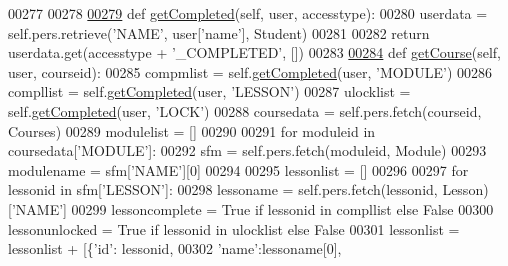\begin{DoxyCode}
00277 
00278 
\hypertarget{CourseUnit_8py_source_l00279}{}\hyperlink{classCourse_1_1CourseUnit_1_1BusCourse_a204497b0a06654e623c9c294f1ca5e66}{00279}     \textcolor{keyword}{def }\hyperlink{classCourse_1_1CourseUnit_1_1BusCourse_a204497b0a06654e623c9c294f1ca5e66}{getCompleted}(self, user, accesstype):
00280         userdata = self.pers.retrieve(\textcolor{stringliteral}{'NAME'}, user[\textcolor{stringliteral}{'name'}], Student)
00281 
00282         \textcolor{keywordflow}{return} userdata.get(accesstype + \textcolor{stringliteral}{'\_COMPLETED'}, [])
00283 
\hypertarget{CourseUnit_8py_source_l00284}{}\hyperlink{classCourse_1_1CourseUnit_1_1BusCourse_a924028d96b633d7810b60699af5502ee}{00284}     \textcolor{keyword}{def }\hyperlink{classCourse_1_1CourseUnit_1_1BusCourse_a924028d96b633d7810b60699af5502ee}{getCourse}(self, user, courseid):
00285         compmlist = self.\hyperlink{classCourse_1_1CourseUnit_1_1IfBusCourse_af764ac539a72d830490a80e4d70f567a}{getCompleted}(user, \textcolor{stringliteral}{'MODULE'})
00286         compllist = self.\hyperlink{classCourse_1_1CourseUnit_1_1IfBusCourse_af764ac539a72d830490a80e4d70f567a}{getCompleted}(user, \textcolor{stringliteral}{'LESSON'})
00287         ulocklist = self.\hyperlink{classCourse_1_1CourseUnit_1_1IfBusCourse_af764ac539a72d830490a80e4d70f567a}{getCompleted}(user, \textcolor{stringliteral}{'LOCK'})
00288         coursedata = self.pers.fetch(courseid, Courses)
00289         modulelist = []
00290         
00291         \textcolor{keywordflow}{for} moduleid \textcolor{keywordflow}{in} coursedata[\textcolor{stringliteral}{'MODULE'}]:
00292             sfm = self.pers.fetch(moduleid, Module)
00293             modulename = sfm[\textcolor{stringliteral}{'NAME'}][0]
00294 
00295             lessonlist = []
00296 
00297             \textcolor{keywordflow}{for} lessonid \textcolor{keywordflow}{in} sfm[\textcolor{stringliteral}{'LESSON'}]:
00298                 lessoname = self.pers.fetch(lessonid, Lesson)[\textcolor{stringliteral}{'NAME'}]
00299                 lessoncomplete = \textcolor{keyword}{True} \textcolor{keywordflow}{if} lessonid \textcolor{keywordflow}{in} compllist \textcolor{keywordflow}{else} \textcolor{keyword}{False}
00300                 lessonunlocked = \textcolor{keyword}{True} \textcolor{keywordflow}{if} lessonid \textcolor{keywordflow}{in} ulocklist \textcolor{keywordflow}{else} \textcolor{keyword}{False}
00301                 lessonlist = lessonlist + [\{\textcolor{stringliteral}{'id'}: lessonid,
00302                                             \textcolor{stringliteral}{'name'}:lessoname[0],

\end{DoxyCode}
